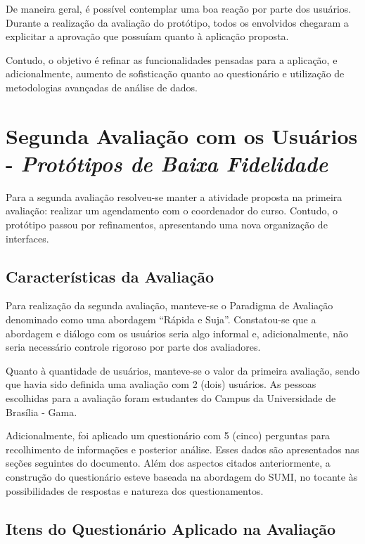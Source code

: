 			De maneira geral, é possível contemplar uma boa reação por parte dos usuários. Durante a realização da avaliação do protótipo, todos os envolvidos chegaram a explicitar a aprovação que possuíam quanto à aplicação proposta.
		
			Contudo, o objetivo é refinar as funcionalidades pensadas para a aplicação, e adicionalmente, aumento de sofisticação quanto ao questionário e utilização de metodologias avançadas de análise de dados.


	\section[Segunda Avaliação com os Usuários - Protótipos de Baixa Fidelidade]{Segunda Avaliação com os Usuários - \emph{Protótipos de Baixa Fidelidade}}
	\label{sec:avaliacaoPrototipos_Segunda}

		Para a segunda avaliação resolveu-se manter a atividade proposta na primeira avaliação: realizar um agendamento com o coordenador do curso. Contudo, o protótipo passou por refinamentos, apresentando uma nova organização de interfaces.

		\subsection[Características da Avaliação]{Características da Avaliação}
		\label{sec:segundaAvaliacao_Caracteristicas}

			Para realização da segunda avaliação, manteve-se o Paradigma de Avaliação denominado como uma abordagem “Rápida e Suja”. Constatou-se que a abordagem e diálogo com os usuários seria algo informal e, adicionalmente, não seria necessário controle rigoroso por parte dos avaliadores.

			Quanto à quantidade de usuários, manteve-se o valor da primeira avaliação, sendo que havia sido definida uma avaliação com 2 (dois) usuários. As pessoas escolhidas para a avaliação foram estudantes do Campus da Universidade de Brasília - Gama.

			Adicionalmente, foi aplicado um questionário com 5 (cinco) perguntas para recolhimento de informações e posterior análise. Esses dados são apresentados nas seções seguintes do documento. Além dos aspectos citados anteriormente, a construção do questionário esteve baseada na abordagem do SUMI, no tocante às possibilidades de respostas e natureza dos questionamentos.

		\subsection[Itens do Questionário Aplicados na Avaliação]{Itens do Questionário Aplicado na Avaliação}
		\label{sec:segundaAvaliacao_Questionario}

